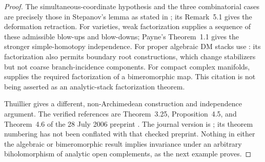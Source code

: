 \begin{proof}
The simultaneous-coordinate hypothesis and the three combinatorial cases are precisely those in Stepanov's lemma as stated in \cite[p.~307]{Payne2013}; its Remark~5.1 gives the deformation retraction. For varieties, weak factorization supplies a sequence of these admissible blow-ups and blow-downs; Payne's Theorem~1.1 gives the stronger simple-homotopy independence. For proper algebraic DM stacks use \cite[Theorems~1.1--1.2]{Harper2017}: its factorization also permits boundary root constructions, which change stabilizers but not coarse branch-incidence components. For compact complex manifolds, \cite[Theorem~0.3.1, especially its normal-crossings clause]{AKMW2002} supplies the required factorization of a bimeromorphic map. This citation is not being asserted as an analytic-stack factorization theorem.

Thuillier gives a different, non-Archimedean construction and independence argument. The verified references are Theorem~3.25, Proposition~4.5, and Theorem~4.6 of the 28 July 2006 preprint \cite{Thuillier2006}. The journal version is \cite{Thuillier2007}; its theorem numbering has not been conflated with that checked preprint. Nothing in either the algebraic or bimeromorphic result implies invariance under an arbitrary biholomorphism of analytic open complements, as the next example proves.
\end{proof}

